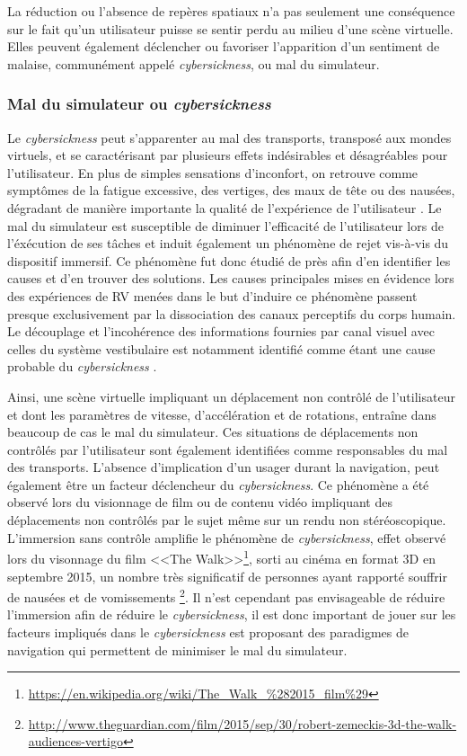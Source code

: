 La réduction ou l'absence de repères spatiaux n'a pas seulement une conséquence sur le fait qu'un utilisateur puisse se sentir perdu au milieu d'une scène virtuelle. Elles peuvent également déclencher ou favoriser l'apparition d'un sentiment de malaise, communément appelé \textit{cybersickness}, ou mal du simulateur. 

\subsubsection{Mal du simulateur ou \textit{cybersickness}} \label{cybersickness}

Le \textit{cybersickness} peut s'apparenter au mal des transports, transposé aux mondes virtuels, et se caractérisant par plusieurs effets indésirables et désagréables pour l'utilisateur. En plus de simples sensations d'inconfort, on retrouve comme symptômes de la fatigue excessive, des vertiges, des maux de tête ou des nausées, dégradant de manière importante la qualité de l'expérience de l'utilisateur \cite{kolasinski1995simulator,laviola_jr_discussion_2000}. Le mal du simulateur est susceptible de diminuer l'efficacité de l'utilisateur lors de l'éxécution de ses tâches et induit également un phénomène de rejet vis-à-vis du dispositif immersif. Ce phénomène fut donc étudié de près afin d'en identifier les causes et d'en trouver des solutions. Les causes principales mises en évidence lors des expériences de RV menées dans le but d'induire ce phénomène passent presque exclusivement par la dissociation des canaux perceptifs du corps humain. Le découplage et l'incohérence des informations fournies par canal visuel avec celles du système vestibulaire  est notamment identifié comme étant une cause probable du \textit{cybersickness} \cite{reason1975motion}. 

Ainsi, une scène virtuelle impliquant un déplacement non contrôlé de l'utilisateur et dont les paramètres de vitesse, d'accélération et de rotations, entraîne dans beaucoup de cas le mal du simulateur. Ces situations de déplacements non contrôlés par l'utilisateur sont également identifiées comme responsables du mal des transports. L'absence d'implication d'un usager durant la navigation, peut également être un facteur déclencheur du \textit{cybersickness}. Ce phénomène a été observé lors du visionnage de film ou de contenu vidéo impliquant des  déplacements non contrôlés par le sujet même sur un rendu non stéréoscopique. L'immersion sans contrôle amplifie le phénomène de \textit{cybersickness}, effet observé lors du visonnage du film <<The Walk>>\footnote{\url{https://en.wikipedia.org/wiki/The\_Walk\_\%282015\_film\%29}}, sorti au cinéma en format 3D en septembre 2015, un nombre très significatif de personnes ayant rapporté souffrir de nausées et de vomissements \footnote{\url{http://www.theguardian.com/film/2015/sep/30/robert-zemeckis-3d-the-walk-audiences-vertigo}}. Il n'est cependant pas envisageable de réduire l'immersion afin de réduire le \textit{cybersickness}, il est donc important de jouer sur les facteurs impliqués dans le \textit{cybersickness} est proposant des paradigmes de navigation qui permettent de minimiser le mal du simulateur.

